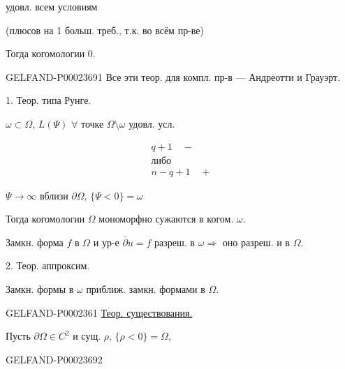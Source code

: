 удовл. всем условиям



(плюсов на 1 больш. треб., т.к. во всём пр-ве)



Тогда когомологии 0.





\begin{GelfandAdjacentEvidence}{GELFAND-P000236}{91}
Все эти теор. для компл. пр-в — Андреотти и Грауэрт.



1. Теор. типа Рунге.



$\omega\subset\Omega$, $L(\Psi)$ $\forall$ точке $\Omega\setminus\omega$ удовл. усл.



\begin{gather*}
 q+1\quad -\\
 \text{либо}\\
 n-q+1\quad +
\end{gather*}



$\Psi\to\infty$ вблизи $\partial\Omega$, $\{\Psi<0\}=\omega$



Тогда когомологии $\Omega$ мономорфно сужаются в когом. $\omega$.



Замкн. форма $f$ в $\Omega$ и ур-е $\bar\partial u=f$ разреш. в $\omega\Rightarrow$ оно разреш. и в $\Omega$.



2. Теор. аппроксим.



Замкн. формы в $\omega$ приближ. замкн. формами в $\Omega$.




\end{GelfandAdjacentEvidence}\begin{GelfandAdjacentEvidence}{GELFAND-P000236}{1}
\underline{Теор. существования.}

Пусть $\partial\Omega\in C^2$ и сущ. $\rho$, $\{\rho<0\}=\Omega$,






\end{GelfandAdjacentEvidence}\begin{GelfandAdjacentEvidence}{GELFAND-P000236}{92}



\end{GelfandAdjacentEvidence}
